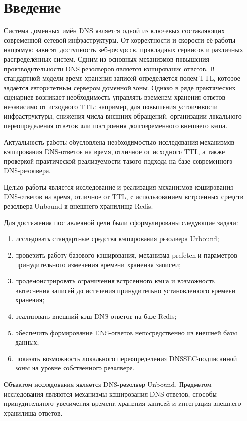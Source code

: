 \documentclass[a4paper,14pt]{extarticle}
\begin{document}
\section{Введение}
Система доменных имён DNS является одной из ключевых составляющих современной сетевой инфраструктуры. От корректности и скорости её работы напрямую зависят доступность веб-ресурсов, прикладных сервисов и различных распределённых систем. Одним из основных механизмов повышения производительности DNS-резолверов является кэширование ответов. В стандартной модели время хранения записей определяется полем TTL, которое задаётся авторитетным сервером доменной зоны. Однако в ряде практических сценариев возникает необходимость управлять временем хранения ответов независимо от исходного TTL: например, для повышения устойчивости инфраструктуры, снижения числа внешних обращений, организации локального переопределения ответов или построения долговременного внешнего кэша.

Актуальность работы обусловлена необходимостью исследования механизмов кэширования DNS-ответов на время, отличное от исходного TTL, а также проверкой практической реализуемости такого подхода на базе современного DNS-резолвера.

Целью работы является исследование и реализация механизмов кэширования DNS-ответов на время, отличное от TTL, с использованием встроенных средств резолвера Unbound и внешнего хранилища Redis.

Для достижения поставленной цели были сформулированы следующие задачи:
\begin{enumerate}
    \item исследовать стандартные средства кэширования резолвера Unbound;
    \item проверить работу базового кэширования, механизма prefetch и параметров принудительного изменения времени хранения записей;
    \item продемонстрировать ограничения встроенного кэша и возможность вытеснения записей до истечения принудительно установленного времени хранения;
    \item реализовать внешний кэш DNS-ответов на базе Redis;
    \item обеспечить формирование DNS-ответов непосредственно из внешней базы данных;
    \item показать возможность локального переопределения DNSSEC-подписанной зоны на уровне собственного резолвера.
\end{enumerate}

Объектом исследования является DNS-резолвер Unbound. Предметом исследования являются механизмы кэширования DNS-ответов, способы принудительного увеличения времени хранения записей и интеграция внешнего хранилища ответов.
\end{document}
